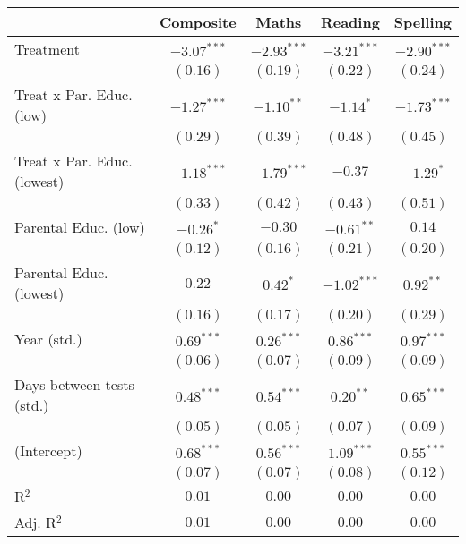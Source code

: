 
\begin{table}
\begin{center}
\begin{tabular}{l c c c c}
\hline
 & Composite & Maths & Reading & Spelling \\
\hline
Treatment                   & $-3.07^{***}$ & $-2.93^{***}$ & $-3.21^{***}$ & $-2.90^{***}$ \\
                            & $(0.16)$      & $(0.19)$      & $(0.22)$      & $(0.24)$      \\
Treat x Par. Educ. (low)    & $-1.27^{***}$ & $-1.10^{**}$  & $-1.14^{*}$   & $-1.73^{***}$ \\
                            & $(0.29)$      & $(0.39)$      & $(0.48)$      & $(0.45)$      \\
Treat x Par. Educ. (lowest) & $-1.18^{***}$ & $-1.79^{***}$ & $-0.37$       & $-1.29^{*}$   \\
                            & $(0.33)$      & $(0.42)$      & $(0.43)$      & $(0.51)$      \\
Parental Educ. (low)        & $-0.26^{*}$   & $-0.30$       & $-0.61^{**}$  & $0.14$        \\
                            & $(0.12)$      & $(0.16)$      & $(0.21)$      & $(0.20)$      \\
Parental Educ. (lowest)     & $0.22$        & $0.42^{*}$    & $-1.02^{***}$ & $0.92^{**}$   \\
                            & $(0.16)$      & $(0.17)$      & $(0.20)$      & $(0.29)$      \\
Year (std.)                 & $0.69^{***}$  & $0.26^{***}$  & $0.86^{***}$  & $0.97^{***}$  \\
                            & $(0.06)$      & $(0.07)$      & $(0.09)$      & $(0.09)$      \\
Days between tests (std.)   & $0.48^{***}$  & $0.54^{***}$  & $0.20^{**}$   & $0.65^{***}$  \\
                            & $(0.05)$      & $(0.05)$      & $(0.07)$      & $(0.09)$      \\
(Intercept)                 & $0.68^{***}$  & $0.56^{***}$  & $1.09^{***}$  & $0.55^{***}$  \\
                            & $(0.07)$      & $(0.07)$      & $(0.08)$      & $(0.12)$      \\
\hline
R$^2$                       & $0.01$        & $0.00$        & $0.00$        & $0.00$        \\
Adj. R$^2$                  & $0.01$        & $0.00$        & $0.00$        & $0.00$        \\

\end{tabular}
\end{center}
\end{table}
